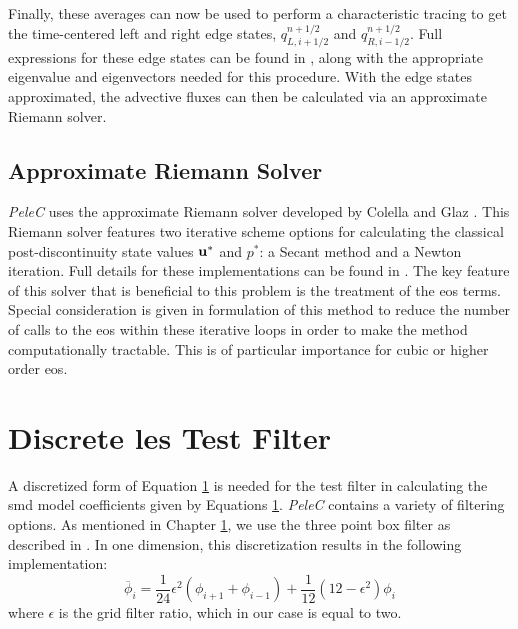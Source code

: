Finally, these averages can now be used to perform a characteristic tracing to get the time-centered left and right edge states, $q_{L, i+1/2}^{n+1/2}$ and $q_{R, i-1/2}^{n+1/2}$. Full expressions for these edge states can be found in \cite{}, along with the appropriate eigenvalue and eigenvectors needed for this procedure. With the edge states approximated, the advective fluxes can then be calculated via an approximate Riemann solver.


\subsection{Approximate Riemann Solver}
\textit{PeleC} uses the approximate Riemann solver developed by Colella and Glaz \cite{}. This Riemann solver features two iterative scheme options for calculating the classical post-discontinuity state values $\vb{u}^*$ and $p^*$: a Secant method and a Newton iteration. Full details for these implementations can be found in \cite{}. The key feature of this solver that is beneficial to this problem is the treatment of the \gls{eos} terms. Special consideration is given in formulation of this method to reduce the number of calls to the \gls{eos} within these iterative loops in order to make the method computationally tractable. This is of particular importance for cubic or higher order \gls{eos}. 

\section{Discrete \gls{les} Test Filter}
A discretized form of Equation \ref{} is needed for the test filter in calculating the \gls{smd} model coefficients given by Equations \ref{}. \textit{PeleC} contains a variety of filtering options. As mentioned in Chapter \ref{}, we use the three point box filter as described in \cite{filter}. In one dimension, this discretization results in the following implementation:
\begin{equation}
\overline{\phi}_i = \dfrac{1}{24}\epsilon^2\left(\phi_{i+1} + \phi_{i-1} \right) + \dfrac{1}{12}\left( 12 - \epsilon^2\right)\phi_i
\end{equation}
where $\epsilon$ is the grid filter ratio, which in our case is equal to two. 


